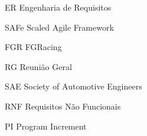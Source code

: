 \begin{siglas}
  \item[ER] Engenharia de Requisitos
  \item[SAFe] Scaled Agile Framework
  \item[FGR] FGRacing
  \item[RG] Reunião Geral
  \item[SAE] Society of Automotive Engineers
  \item[RNF] Requisitos Não Funcionais
  \item[PI] Program Increment
\end{siglas}
